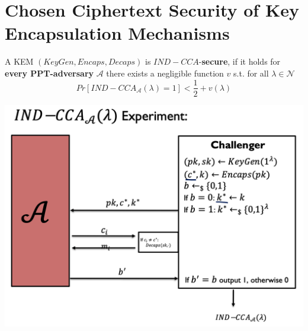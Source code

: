     \section{Chosen Ciphertext Security of Key Encapsulation Mechanisms}
        \begin{definition}
            A KEM $(KeyGen,Encaps,Decaps)$ is $IND-CCA$-\textbf{secure}, if it holds for \textbf{every PPT-adversary} $\mathcal{A}$ there exists a negligible function $v$ s.t. for all $\lambda \in \mathcal{N}$
            $$Pr[IND-CCA_{\mathcal{A}}(\lambda)=1] < \frac{1}{2} + v(\lambda)$$
        \end{definition}
        \begin{center}
	        \includegraphics[width=180mm]{Graphics/Chosen Ciphertext Secure Public Key Encryption/cca6.png}
        \end{center}

\newpage

